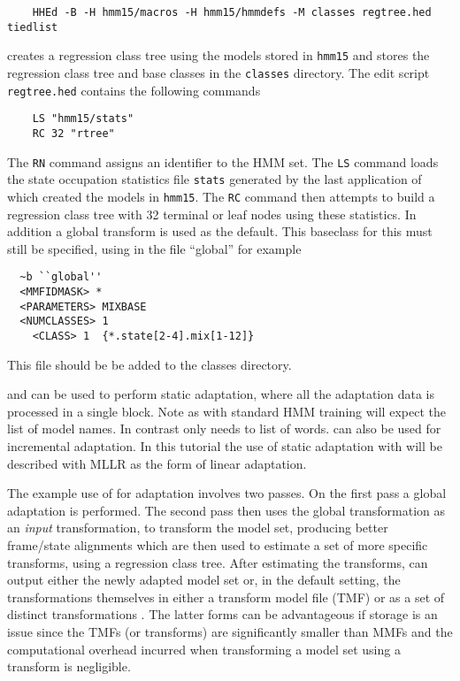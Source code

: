 \begin{verbatim}
    HHEd -B -H hmm15/macros -H hmm15/hmmdefs -M classes regtree.hed tiedlist
\end{verbatim}

\noindent
creates a regression class tree using the models stored in
\texttt{hmm15} and stores the regression class tree and base classes
in the \texttt{classes} directory.  The  edit script
\texttt{regtree.hed} contains the following commands

\begin{verbatim}
    LS "hmm15/stats"
    RC 32 "rtree"
\end{verbatim}


\noindent
The \texttt{RN} command assigns an
identifier to the HMM set.
The \texttt{LS} command loads the state 
occupation statistics file 
\texttt{stats} generated by the last application of  which 
created the models in \texttt{hmm15}. 
The \texttt{RC} command then attempts to build 
a regression class tree with 32 terminal or leaf nodes using these statistics.
In addition a global transform is used as the default. This baseclass for this
must still be specified, using in the file ``global'' for example

\begin{verbatim}
  ~b ``global''
  <MMFIDMASK> *
  <PARAMETERS> MIXBASE
  <NUMCLASSES> 1
    <CLASS> 1  {*.state[2-4].mix[1-12]}      

\end{verbatim}
This file should be be added to the classes directory.
 
 and  can be used to perform static adaptation, where all the
adaptation data is processed in a single block. Note as with standard HMM
training  will expect the list of model names. In contrast 
 only needs to list of words.  can also be used
for incremental adaptation. In this tutorial the use of static 
adaptation with  will be described with MLLR as the form
of linear adaptation.

The example use of  for adaptation involves two
passes. On the first pass a global adaptation is performed. The second
pass then uses the global transformation as an {\em input}
transformation, to transform the model set, producing better
frame/state alignments which are then used to estimate a set of more
specific transforms, using a regression class tree.  After estimating
the transforms,  can output either the newly adapted
model set or, in the default setting, the transformations themselves
in either a transform model file (TMF) or as a set of distinct transformations .  The latter
forms can be advantageous if storage is an issue since the TMFs (or
transforms) are
significantly smaller than MMFs and the computational overhead
incurred when transforming a model set using a transform is negligible.
 
